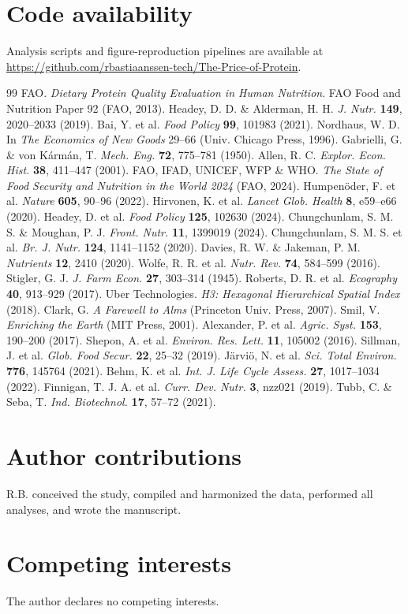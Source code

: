 \documentclass[11pt,a4paper]{article}
\begin{document}
\section*{Code availability}
Analysis scripts and figure-reproduction pipelines are available at \url{https://github.com/rbastiaanssen-tech/The-Price-of-Protein}.

\begin{thebibliography}{99}
 FAO. \emph{Dietary Protein Quality Evaluation in Human Nutrition}. FAO Food and Nutrition Paper 92 (FAO, 2013).
 Headey, D. D. \& Alderman, H. H. \emph{J. Nutr.} \textbf{149}, 2020--2033 (2019).
 Bai, Y. et al. \emph{Food Policy} \textbf{99}, 101983 (2021).
 Nordhaus, W. D. In \emph{The Economics of New Goods} 29--66 (Univ. Chicago Press, 1996).
 Gabrielli, G. \& von K\'arm\'an, T. \emph{Mech. Eng.} \textbf{72}, 775--781 (1950).
 Allen, R. C. \emph{Explor. Econ. Hist.} \textbf{38}, 411--447 (2001).
 FAO, IFAD, UNICEF, WFP \& WHO. \emph{The State of Food Security and Nutrition in the World 2024} (FAO, 2024).
 Humpen\"oder, F. et al. \emph{Nature} \textbf{605}, 90--96 (2022).
 Hirvonen, K. et al. \emph{Lancet Glob. Health} \textbf{8}, e59--e66 (2020).
 Headey, D. et al. \emph{Food Policy} \textbf{125}, 102630 (2024).
 Chungchunlam, S. M. S. \& Moughan, P. J. \emph{Front. Nutr.} \textbf{11}, 1399019 (2024).
 Chungchunlam, S. M. S. et al. \emph{Br. J. Nutr.} \textbf{124}, 1141--1152 (2020).
 Davies, R. W. \& Jakeman, P. M. \emph{Nutrients} \textbf{12}, 2410 (2020).
 Wolfe, R. R. et al. \emph{Nutr. Rev.} \textbf{74}, 584--599 (2016).
 Stigler, G. J. \emph{J. Farm Econ.} \textbf{27}, 303--314 (1945).
 Roberts, D. R. et al. \emph{Ecography} \textbf{40}, 913--929 (2017).
 Uber Technologies. \emph{H3: Hexagonal Hierarchical Spatial Index} (2018).
 Clark, G. \emph{A Farewell to Alms} (Princeton Univ. Press, 2007).
 Smil, V. \emph{Enriching the Earth} (MIT Press, 2001).
 Alexander, P. et al. \emph{Agric. Syst.} \textbf{153}, 190--200 (2017).
 Shepon, A. et al. \emph{Environ. Res. Lett.} \textbf{11}, 105002 (2016).
 Sillman, J. et al. \emph{Glob. Food Secur.} \textbf{22}, 25--32 (2019).
 J\"arvi\"o, N. et al. \emph{Sci. Total Environ.} \textbf{776}, 145764 (2021).
 Behm, K. et al. \emph{Int. J. Life Cycle Assess.} \textbf{27}, 1017--1034 (2022).
 Finnigan, T. J. A. et al. \emph{Curr. Dev. Nutr.} \textbf{3}, nzz021 (2019).
 Tubb, C. \& Seba, T. \emph{Ind. Biotechnol.} \textbf{17}, 57--72 (2021).
\end{thebibliography}

\section*{Author contributions}
R.B. conceived the study, compiled and harmonized the data, performed all analyses, and wrote the manuscript.

\section*{Competing interests}
The author declares no competing interests.
\end{document}
